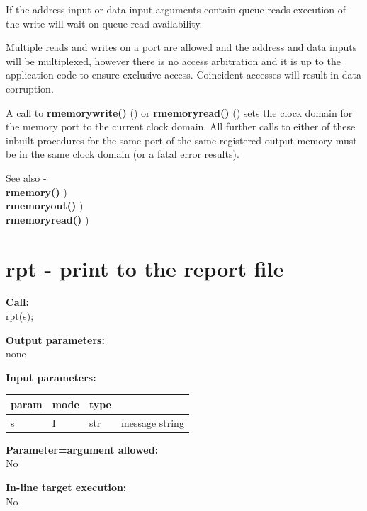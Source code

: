         If the address input or data input arguments contain queue reads
        execution of the write will wait on queue read availability.

        Multiple reads and writes on a port are allowed and the address and
        data inputs will be multiplexed, however there is no access arbitration
        and it is up to the application code to ensure exclusive access.
        Coincident accesses will result in data corruption.
        
        A call to {\bf rmemorywrite()} () or {\bf rmemoryread()}
        () sets the clock domain for the memory port to the
        current clock domain. All further calls to either of these inbuilt
        procedures for the same port of the same registered output memory must
        be in the same clock domain (or a fatal error results).

        See also - \\
        {\bf rmemory()} ) \\
        {\bf rmemoryout()} ) \\
        {\bf rmemoryread()} ) \\



    \section{rpt - print to the report file}\label{sec:iprpt}
        
        {\bf Call:} \\
        rpt(s);
        
        {\bf Output parameters:} \\
        none
        
        {\bf Input parameters:} \\
        \begin{tabular}{| l | l | l | l |}
        \hline
        param & mode & type & \\
        \hline \hline
        s & I & str & message string    \\ \hline
        \end{tabular}
        
        {\bf Parameter=argument allowed:} \\
        No
        
        {\bf In-line target execution:} \\
        No
        
